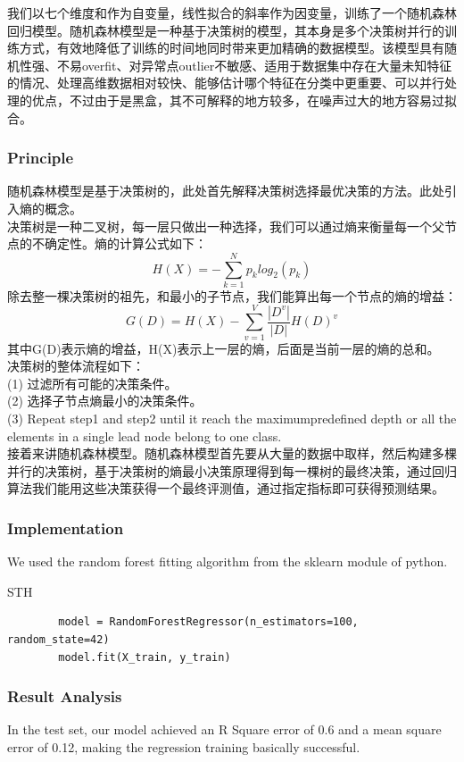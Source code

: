 \documentclass[a4paper]{article}
\begin{document}
我们以七个维度和作为自变量，线性拟合的斜率作为因变量，训练了一个随机森林回归模型。随机森林模型是一种基于决策树的模型，其本身是多个决策树并行的训练方式，有效地降低了训练的时间地同时带来更加精确的数据模型。该模型具有随机性强、不易overfit、对异常点outlier不敏感、适用于数据集中存在大量未知特征的情况、处理高维数据相对较快、能够估计哪个特征在分类中更重要、可以并行处理的优点，不过由于是黑盒，其不可解释的地方较多，在噪声过大的地方容易过拟合。
\subsubsection{Principle}
随机森林模型是基于决策树的，此处首先解释决策树选择最优决策的方法。此处引入熵的概念。\\
决策树是一种二叉树，每一层只做出一种选择，我们可以通过熵来衡量每一个父节点的不确定性。熵的计算公式如下：\\
$$H(X)= -\sum_{k=1}^N p_k log_2(p_k)$$
除去整一棵决策树的祖先，和最小的子节点，我们能算出每一个节点的熵的增益：
$$G(D)= H(X)-\sum_{v=1}^V \frac {\left|D^v\right|}{\left|D\right|} H(D)^v$$
其中G(D)表示熵的增益，H(X)表示上一层的熵，后面是当前一层的熵的总和。\\
决策树的整体流程如下：\\
(1) 过滤所有可能的决策条件。\\
(2) 选择子节点熵最小的决策条件。\\
(3) Repeat step1 and step2 until it reach the maximumpredefined depth or all the elements in a single lead node belong to one class.\\[1em]
接着来讲随机森林模型。随机森林模型首先要从大量的数据中取样，然后构建多棵并行的决策树，基于决策树的熵最小决策原理得到每一棵树的最终决策，通过回归算法我们能用这些决策获得一个最终评测值，通过指定指标即可获得预测结果。
\subsubsection{Implementation}
We used the random forest fitting algorithm from the sklearn module of python.
\begin{listing}[htb]\caption{STH}\label{code:processdweet}
    \begin{verbatim}
        model = RandomForestRegressor(n_estimators=100, random_state=42)
        model.fit(X_train, y_train)
\end{verbatim} 
\end{listing}


\subsubsection{Result Analysis}
In the test set, our model achieved an R Square error of 0.6 and a mean square error of 0.12, making the regression training basically successful.
\end{document}
